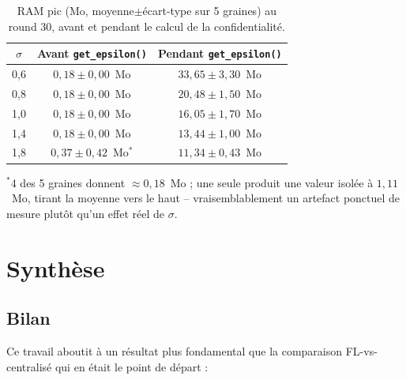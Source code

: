 \documentclass{acmart}
\begin{document}
\begin{table}[h!]
\centering
\small
\caption{RAM pic (Mo, moyenne$\pm$écart-type sur 5 graines) au round 30, avant et
pendant le calcul de la confidentialité.}
\label{tab:ram}
\begin{tabular}{ccc}
\toprule
$\sigma$ & Avant \texttt{get\_epsilon()} & Pendant \texttt{get\_epsilon()} \\
\midrule
0,6 & $0{,}18\pm0{,}00$~Mo & $33{,}65\pm3{,}30$~Mo \\
0,8 & $0{,}18\pm0{,}00$~Mo & $20{,}48\pm1{,}50$~Mo \\
1,0 & $0{,}18\pm0{,}00$~Mo & $16{,}05\pm1{,}70$~Mo \\
1,4 & $0{,}18\pm0{,}00$~Mo & $13{,}44\pm1{,}00$~Mo \\
1,8 & $0{,}37\pm0{,}42$~Mo$^{*}$ & $11{,}34\pm0{,}43$~Mo \\
\bottomrule
\end{tabular}

\vspace{2pt}
{\footnotesize $^{*}$4 des 5 graines donnent $\approx0{,}18$~Mo ; une seule produit une
valeur isolée à $1{,}11$~Mo, tirant la moyenne vers le haut -- vraisemblablement un
artefact ponctuel de mesure plutôt qu'un effet réel de $\sigma$.}
\end{table}

\section{Synthèse}

\subsection{Bilan}

Ce travail aboutit à un résultat plus fondamental que la comparaison FL-vs-centralisé
qui en était le point de départ :
\end{document}
